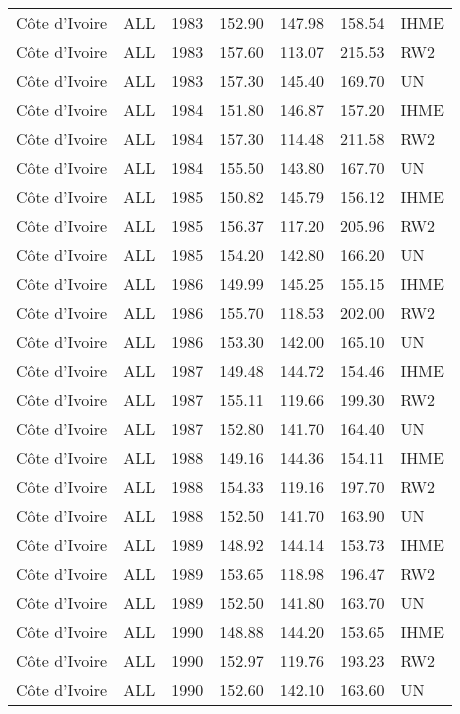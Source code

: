 \begin{longtable}{lllrrrl}
  C\^{o}te d'Ivoire & ALL & 1983 & 152.90 & 147.98 & 158.54 & IHME \\ 
  C\^{o}te d'Ivoire & ALL & 1983 & 157.60 & 113.07 & 215.53 & RW2 \\ 
  C\^{o}te d'Ivoire & ALL & 1983 & 157.30 & 145.40 & 169.70 & UN \\ 
  C\^{o}te d'Ivoire & ALL & 1984 & 151.80 & 146.87 & 157.20 & IHME \\ 
  C\^{o}te d'Ivoire & ALL & 1984 & 157.30 & 114.48 & 211.58 & RW2 \\ 
  C\^{o}te d'Ivoire & ALL & 1984 & 155.50 & 143.80 & 167.70 & UN \\ 
  C\^{o}te d'Ivoire & ALL & 1985 & 150.82 & 145.79 & 156.12 & IHME \\ 
  C\^{o}te d'Ivoire & ALL & 1985 & 156.37 & 117.20 & 205.96 & RW2 \\ 
  C\^{o}te d'Ivoire & ALL & 1985 & 154.20 & 142.80 & 166.20 & UN \\ 
  C\^{o}te d'Ivoire & ALL & 1986 & 149.99 & 145.25 & 155.15 & IHME \\ 
  C\^{o}te d'Ivoire & ALL & 1986 & 155.70 & 118.53 & 202.00 & RW2 \\ 
  C\^{o}te d'Ivoire & ALL & 1986 & 153.30 & 142.00 & 165.10 & UN \\ 
  C\^{o}te d'Ivoire & ALL & 1987 & 149.48 & 144.72 & 154.46 & IHME \\ 
  C\^{o}te d'Ivoire & ALL & 1987 & 155.11 & 119.66 & 199.30 & RW2 \\ 
  C\^{o}te d'Ivoire & ALL & 1987 & 152.80 & 141.70 & 164.40 & UN \\ 
  C\^{o}te d'Ivoire & ALL & 1988 & 149.16 & 144.36 & 154.11 & IHME \\ 
  C\^{o}te d'Ivoire & ALL & 1988 & 154.33 & 119.16 & 197.70 & RW2 \\ 
  C\^{o}te d'Ivoire & ALL & 1988 & 152.50 & 141.70 & 163.90 & UN \\ 
  C\^{o}te d'Ivoire & ALL & 1989 & 148.92 & 144.14 & 153.73 & IHME \\ 
  C\^{o}te d'Ivoire & ALL & 1989 & 153.65 & 118.98 & 196.47 & RW2 \\ 
  C\^{o}te d'Ivoire & ALL & 1989 & 152.50 & 141.80 & 163.70 & UN \\ 
  C\^{o}te d'Ivoire & ALL & 1990 & 148.88 & 144.20 & 153.65 & IHME \\ 
  C\^{o}te d'Ivoire & ALL & 1990 & 152.97 & 119.76 & 193.23 & RW2 \\ 
  C\^{o}te d'Ivoire & ALL & 1990 & 152.60 & 142.10 & 163.60 & UN \\ 

\end{longtable}
